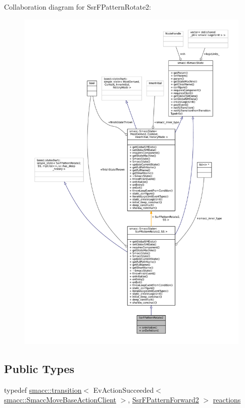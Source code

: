 Collaboration diagram for Ssr\+F\+Pattern\+Rotate2\+:
\nopagebreak
\begin{figure}[H]
\begin{center}
\leavevmode
\includegraphics[width=350pt]{structSsrFPatternRotate2__coll__graph}
\end{center}
\end{figure}
\subsection*{Public Types}
\begin{DoxyCompactItemize}
\item 
typedef \hyperlink{classsmacc_1_1transition}{smacc\+::transition}$<$ Ev\+Action\+Succeeded$<$ \hyperlink{classsmacc_1_1SmaccMoveBaseActionClient}{smacc\+::\+Smacc\+Move\+Base\+Action\+Client} $>$, \hyperlink{structSsrFPatternForward2}{Ssr\+F\+Pattern\+Forward2} $>$ \hyperlink{structSsrFPatternRotate2_a3445f798fb3d6c6f2b468aefc7cf9ecb}{reactions}
\end{DoxyCompactItemize}
